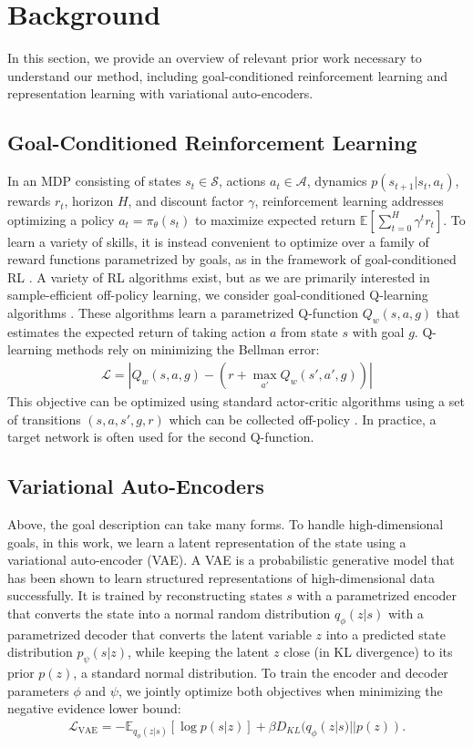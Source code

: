 \documentclass{article}
\newcommand{\E}{\mathbb{E}}
\begin{document}
\section{Background}

In this section, we provide an overview of relevant prior work necessary to understand our method, including goal-conditioned reinforcement learning and representation learning with variational auto-encoders.

\subsection{Goal-Conditioned Reinforcement Learning}
In an MDP consisting of states $s_t \in \mathcal S$, actions $a_t \in \mathcal A$, dynamics $p(s_{t+1}|s_t, a_t)$, rewards $r_t$, horizon $H$, and discount factor $\gamma$, reinforcement learning addresses optimizing a policy $a_t = \pi_\theta(s_t)$ to maximize expected return $\E[\sum_{t=0}^{H} \gamma^t r_t]$. To learn a variety of skills, it is instead convenient to optimize over a family of reward functions parametrized by goals, as in the framework of goal-conditioned RL \cite{kaelbling1993goals}. A variety of RL algorithms exist, but as we are primarily interested in sample-efficient off-policy learning, we consider goal-conditioned Q-learning algorithms \cite{schaul2015uva}. These algorithms learn a parametrized Q-function $Q_w(s, a, g)$ that estimates the expected return of taking action $a$ from state $s$ with goal $g$. Q-learning methods rely on minimizing the Bellman error:
\begin{align} \label{eq:bellman}
    \mathcal{L} = |Q_w(s, a, g) - (r + \max_{a'} Q_w(s', a', g))|
\end{align}
This objective can be optimized using standard actor-critic algorithms using a set of transitions $(s, a, s', g, r)$ which can be collected off-policy \cite{lillicrap2015continuous}.
In practice, a target network is often used for the second Q-function.

\subsection{Variational Auto-Encoders}
Above, the goal description can take many forms. To handle high-dimensional goals, in this work, we learn a latent representation of the state using a variational auto-encoder (VAE).
A VAE is a probabilistic generative model that has been shown to learn structured representations of high-dimensional data \cite{kingma2014vae} successfully. It is trained by reconstructing states $s$ with a parametrized encoder that converts the state into a normal random distribution $q_\phi(z|s)$ with a parametrized decoder that converts the latent variable $z$ into a predicted state distribution $p_\psi(s|z)$, while keeping the latent $z$ close (in KL divergence) to its prior $p(z)$, a standard normal distribution. To train the encoder and decoder parameters $\phi$ and $\psi$, we jointly optimize both objectives when minimizing the negative evidence lower bound:
\begin{align}
    \mathcal L_\text{VAE} = -\E_{q_\phi(z|s)} [\log p(s|z)] + \beta D_{KL}(q_\phi(z|s)||p(z)).
\end{align}
\end{document}
